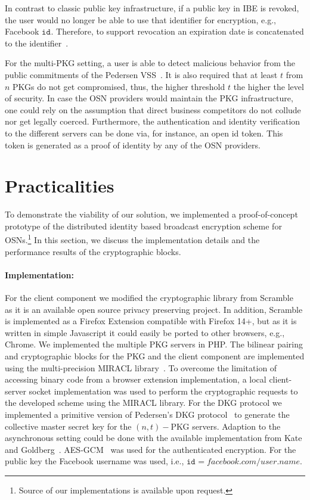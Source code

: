 \documentclass[journal]{IEEEtran}
\newcommand{\id}[1]{\ensuremath{\mathtt{id}_{#1}}}
\begin{document}
In contrast to classic public key infrastructure, if a public key in IBE is revoked, the user would no longer be able to use that identifier for encryption, e.g., Facebook \id{}. Therefore, to support revocation an expiration date is concatenated to the identifier~\cite{BonehFranklinIBE}. 

For the multi-PKG setting, a user is able to detect malicious behavior from the public commitments of the Pedersen VSS~\cite{Pedersen:1991:NIS:646756.705507}. It is also required that at least $t$ from $n$ PKGs do not get compromised, thus, the higher threshold $t$ the higher the level of security. In case the OSN providers would maintain the PKG infrastructure, one could rely on the assumption that direct business competitors do not collude nor get legally coerced. Furthermore, the authentication and identity verification to the different servers can be done via, for instance, an open id token. This token is generated as a proof of identity by any of the OSN providers.


\section{Practicalities}\label{sec:impl}
To demonstrate the viability of our solution, we implemented a proof-of-concept prototype of the distributed identity based broadcast encryption scheme for OSNs.\footnote{Source of our implementations is available upon request.} In this section, we discuss the implementation details and the performance results of the cryptographic blocks.

\paragraph{Implementation:}
For the client component we modified the cryptographic library from Scramble~\cite{BeatoScramble} as it is an available open source privacy preserving project. In addition, Scramble is implemented as a Firefox Extension compatible with Firefox 14+, but as it is written in simple Javascript it could easily be ported to other browsers, e.g., Chrome. 
We implemented the multiple PKG servers in PHP.
The bilinear pairing and cryptographic blocks for the PKG and the client component are implemented using the multi-precision {MIRACL} library~\cite{scott2003miracl}. To overcome the limitation of accessing binary code from a browser extension implementation, a local client-server socket implementation was used to perform the cryptographic requests to the developed scheme using the {MIRACL} library.
For the DKG protocol we implemented a primitive version of Pedersen's DKG protocol~\cite{art:Pedersen91a} to generate the collective master secret key for the $(n,t)-$PKG servers. Adaption to the asynchronous setting could be done with the available implementation from Kate and Goldberg~\cite{DBLP:conf/icdcs/KateG09,dkg-software}. AES-GCM~\cite{rfc5288} was used for the authenticated encryption. For the public key the Facebook username was used, i.e., $\id{}=facebook.com/user.name$. 
\end{document}
